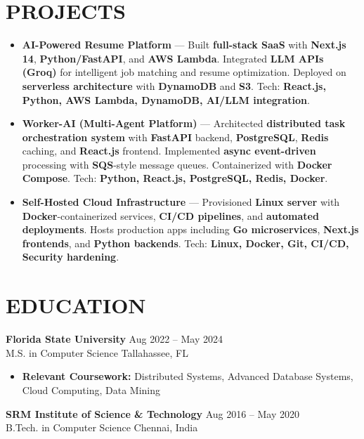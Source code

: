 \documentclass[letterpaper,10pt]{article}
\newcommand{\resumeItem}[1]{\item\small #1}
\newcommand{\resumeSubheading}[4]{
  \vspace{6pt}
  \noindent
  \textbf{#1} \hfill {\footnotesize #2} \\
  [-1pt]
  \noindent
  \small #3 \hfill {\small #4}
  \vspace{3pt}
}
\newcommand{\resumeItemsStart}{\vspace{-2pt}\begin{itemize}}
\newcommand{\resumeItemsEnd}{\end{itemize}\vspace{6pt}}
\begin{document}
\section{\textcolor{metablue}{PROJECTS}}
\vspace{-3pt}
\begin{tcolorbox}[colback=white,colframe=metablue,boxrule=0.8pt,arc=2pt,left=4pt,right=4pt,top=2pt,bottom=2pt,breakable]
\begin{itemize}
\resumeItem{\textbf{AI-Powered Resume Platform} --- Built \textbf{full-stack SaaS} with \textbf{Next.js 14}, \textbf{Python/FastAPI}, and \textbf{AWS Lambda}. Integrated \textbf{LLM APIs (Groq)} for intelligent job matching and resume optimization. Deployed on \textbf{serverless architecture} with \textbf{DynamoDB} and \textbf{S3}. Tech: \textbf{React.js, Python, AWS Lambda, DynamoDB, AI/LLM integration}.}

\resumeItem{\textbf{Worker-AI (Multi-Agent Platform)} --- Architected \textbf{distributed task orchestration system} with \textbf{FastAPI} backend, \textbf{PostgreSQL}, \textbf{Redis} caching, and \textbf{React.js} frontend. Implemented \textbf{async event-driven} processing with \textbf{SQS}-style message queues. Containerized with \textbf{Docker Compose}. Tech: \textbf{Python, React.js, PostgreSQL, Redis, Docker}.}

\resumeItem{\textbf{Self-Hosted Cloud Infrastructure} --- Provisioned \textbf{Linux server} with \textbf{Docker}-containerized services, \textbf{CI/CD pipelines}, and \textbf{automated deployments}. Hosts production apps including \textbf{Go microservices}, \textbf{Next.js frontends}, and \textbf{Python backends}. Tech: \textbf{Linux, Docker, Git, CI/CD, Security hardening}.}

\end{itemize}
\end{tcolorbox}
\vspace{-5pt}


\section{\textcolor{metablue}{EDUCATION}}
\vspace{-10pt}
\resumeSubheading
{Florida State University}{Aug 2022 -- May 2024}
{M.S. in Computer Science}{Tallahassee, FL}
\resumeItemsStart
\resumeItem{\textbf{Relevant Coursework:} Distributed Systems, Advanced Database Systems, Cloud Computing, Data Mining}
\resumeItemsEnd
\vspace{-5pt}
\resumeSubheading
{SRM Institute of Science \& Technology}{Aug 2016 -- May 2020}
{B.Tech. in Computer Science}{Chennai, India}
\vspace{-10pt}
\end{document}

